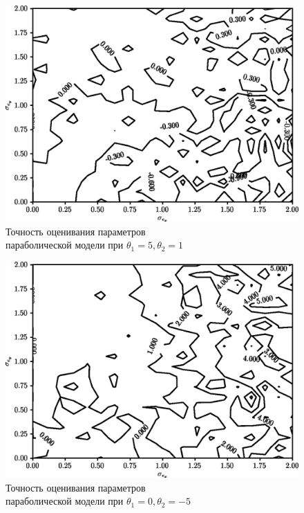 \begin{figure}[h!]
  \centering
  \includegraphics[width=135mm]{fig/nonlinear/quadratic/alpha-5_beta-1.png}
  \caption{
    Точность оценивания параметров \\
    параболической модели при \( \theta_1 = 5, \theta_2 = 1 \)
  }\label{fig:comparison_nonlinear_quadratic_alpha-5_beta-1}
\end{figure}

\begin{figure}[h!]
  \centering
  \includegraphics[width=135mm]{fig/nonlinear/quadratic/alpha-0_beta--5.png}
  \caption{
    Точность оценивания параметров \\
    параболической модели при \( \theta_1 = 0, \theta_2 = -5 \)
  }\label{fig:comparison_nonlinear_quadratic_alpha-0_beta--5}
\end{figure}

